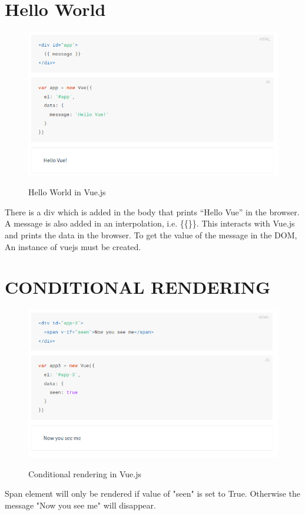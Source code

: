 \documentclass[12pt,a4paper,oneside]{report}
\begin{document}
\section{Hello World}
\begin{figure}[H]
    \begin{center}
        \label{abc}
            \includegraphics[scale=.6]{vueHelloWorld.png}
            \caption{Hello World in Vue.js \cite{vue-code} }
    \end{center}
\end{figure}
There is a div which is added in the body that prints “Hello Vue” in the browser. A message is also added in an interpolation, i.e. \{\{\}\}. This interacts with Vue.js and prints the data in the browser. To get the value of the message in the DOM, An instance of vuejs must be created.
\section{CONDITIONAL RENDERING}
\begin{figure}[H]
    \begin{center}
        \label{abc}
            \includegraphics[scale=.6]{v-if.png}
            \caption{Conditional rendering in Vue.js \cite{vue-code}  }
    \end{center}
\end{figure}
Span element will only be rendered if value of "seen" is set to True. Otherwise the message "Now you see me" will disappear.
\end{document}
